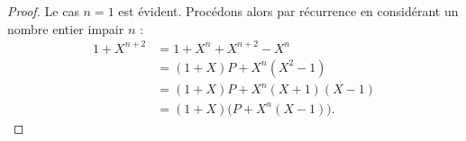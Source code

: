 \begin{proof}
    Le cas \( n=1\) est évident. Procédons alors par récurrence en considérant un nombre entier impair \( n\) :
    \begin{subequations}
        \begin{align}
            1+X^{n+2}&=1+X^n+X^{n+2}-X^n\\
                    &=(1+X)P+X^n(X^2-1)\\
                    &=(1+X)P+X^n(X+1)(X-1)\\
                    &=(1+X)\big( P+X^n(X-1) \big).
        \end{align}
    \end{subequations}
\end{proof}
